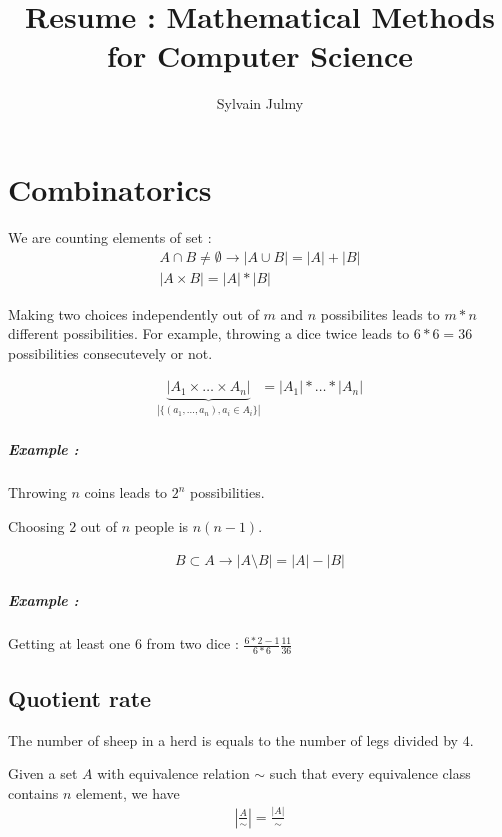 \documentclass[a4paper,11pt]{report}
\title{Resume : Mathematical Methods for Computer Science}
\author{Sylvain Julmy}
\begin{document}
\maketitle

\chapter{Combinatorics}
We are counting elements of set :
\begin{gather}
  A \cap B \neq \emptyset \to |A \cup B| = |A| + |B| \\
  |A \times B| = |A| * |B|
\end{gather}

Making two choices independently out of $m$ and $n$ possibilites leads to $m *
n$ different possibilities. For example, throwing a dice twice leads to $6*6=36$
possibilities consecutevely or not.

\begin{gather}
  \underbrace{|A_1 \times \dots \times A_n|}_{|\{(a_1,\dots,a_n), a_i \in A_i\}|} = |A_1| * \dots * |A_n|
\end{gather}

\paragraph{Example : } Throwing $n$ coins leads to $2^n$ possibilities.

Choosing $2$ out of $n$ people is $n(n-1)$.

\begin{gather}
  B \subset A \to |A \setminus B| = |A| - |B|
\end{gather}

\paragraph{Example : } Getting at least one $6$ from two dice : $\frac{6 * 2 - 1}{6*6} \frac{11}{36}$

\section{Quotient rate}

The number of sheep in a herd is equals to the number of legs divided by $4$.

Given a set $A$ with equivalence relation $\sim$ such that every equivalence
class contains $n$ element, we have
\begin{gather}
  |\frac{A}{\sim}| = \frac{|A|}{\sim}
\end{gather}
\end{document}
